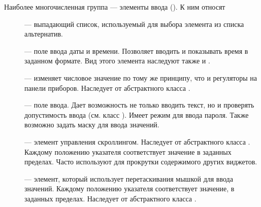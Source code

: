 Наиболее многочисленная группа --- элементы ввода (). 
К ним относят 
\begin{description}
\item[] ---
выпадающий список, используемый для выбора элемента из списка
альтернатив. 
\item[] --- поле  ввода даты и времени.
Позволяет вводить и показывать время в заданном формате. Вид этого элемента наследуют также  и .
\item[] --- изменяет числовое значение по тому же
принципу, что и регуляторы на панели приборов. Наследует от абстрактного класса .
\item[] --- поле ввода. Дает возможность не только вводить текст, но и
проверять допустимость ввода (см. класс ). Имеет режим для ввода пароля. Также возможно задать маску для
ввода значений.
\item[] --- элемент управления скроллингом.
Наследует от абстрактного класса . Каждому положению указателя соответствует значение в заданных
пределах. Часто используют для прокрутки содержимого других виджетов.
\item[] --- элемент, который использует
перетаскивания мышкой для ввода значений. Каждому положению указателя соответствует значение, в заданных пределах.
Наследует от абстрактного класса . 
\end{description}

